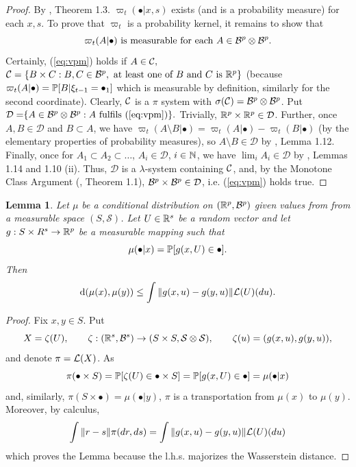 \documentclass{article}              %
\newtheorem{lemma}{Lemma}
\begin{document}
\begin{proof}
By \cite{villani2003topics}, Theorem 1.3. $\varpi_{t}(\bullet|x,s)$
exists (and is a probability measure) for each $x,s$. To prove that
$\varpi_{t}$ is a probability kernel, it remains to show that
\begin{equation}
\text{\ensuremath{\varpi_{t}(A|\bullet)} is measurable for each \ensuremath{A\in\B^{p}\otimes\B^{p}.}}\label{eq:vpm}
\end{equation}
Certainly, (\ref{eq:vpm}) holds if $A\in\C,$ $\C=\{B\times C:B,C\in\B^{p},\text{ at least one of $B$ and $C$ is $\R^p$}\}$
(because $\varpi_{t}(A|\bullet)=\P[B|\xi_{t-1}=\bullet_{1}]$ which
is measurable by definition, similarly for the second coordinate).
Clearly, $\C$ is a $\pi$ system with $\sigma(\C)=\B^{p}\otimes\B^{p}$.
Put $\mathcal{D=}\{A\in\B^{p}\otimes\B^{p}:A\text{ fulfils (\ref{eq:vpm})}\}.$
Trivially, $\R^{p}\times\R^{p}\in\mathcal{D}$. Further, once
$A,B\in\mathcal{D}$ and $B\subset A$, we have $\varpi_{t}(A\setminus B|\bullet)=\varpi_{t}(A|\bullet)-\varpi_{t}(B|\bullet)$
(by the elementary properties of probability measures), so $A\setminus B\in\mathcal{D}$
by \cite{Kallenberg02}, Lemma 1.12. Finally, once 
for $A_{1}\subset A_{2}\subset\dots$, $A_{i}\in\mathcal{D}$, $i\in \N$, we have $\lim_{i}A_{i}\in\mathcal{D}$
by \cite{Kallenberg02}, Lemmas 1.14 and 1.10 (ii). Thus, $\mathcal{D}$
is a $\lambda$-system containing $\C$, and, by the Monotone Class
Argument (\cite{Kallenberg02}, Theorem 1.1), $\B^{p}\times\B^{p}\in\mathcal{D}$,
i.e. (\ref{eq:vpm}) holds true.
\end{proof}
 
 
\begin{lemma}
\label{lem:flemma}Let $\mu$ be a conditional distribution on $(\R^{p},\B^{p})$ given values from from a measurable
space $(S,\mathcal{S})$. Let $U\in\R^{s}$
be a random vector and let $g:S\times R^{s}\rightarrow\R^{p}$ be
a measurable mapping such that 
\begin{equation}
\mu(\bullet|x)=\P[g(x,U)\in\bullet].\label{eq:gut}
\end{equation}
Then
\[
\mathrm{d}(\mu(x),\mu(y))\leq\int\|g(x,u)-g(y,u)\|\L(U)(du).
\]
\end{lemma}

\begin{proof}
Fix $x,y\in S$. Put
\[
X=\zeta(U),\qquad 
\zeta:(\R^{s},\B^{s})\rightarrow(S\times S,\mathcal{S}\otimes\mathcal{S}),\qquad\zeta(u)=(g(x,u),g(y,u)),
\]
and denote $\pi=\L(X)$. As
\[
\pi(\bullet\times S)=\P[\zeta(U)\in\bullet\times S]=\P[g(x,U)\in\bullet]=\mu(\bullet|x)
\]
and, similarly, $\pi(S\times\bullet)=\mu(\bullet|y)$, $\pi$ is a
transportation from $\mu(x)$ to $\mu(y)$. Moreover, by calculus,
\[
\int\|r-s\|\pi(dr,ds)=\int\|g(x,u)-g(y,u)\|\L(U)(du)
\]
which proves the Lemma because the l.h.s. majorizes the Wasserstein
distance. 
\end{proof}
\end{document}
